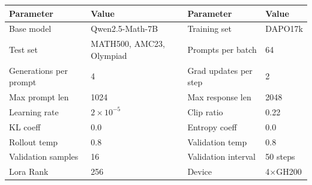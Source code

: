 \documentclass{article}
\theoremstyle{plain}
\theoremstyle{definition}
\theoremstyle{remark}
\begin{document}
\begin{table}[h]
  \centering
  \label{tab:config-7b}
  \begin{tcolorbox}[
    enhanced, hbox,
    title={Training setup of Qwen2.5-Math-7B},
    colback=teal!5, colframe=teal, coltext=black, coltitle=white,
    fonttitle=\bfseries, arc=1mm, boxrule=1pt, boxsep=1pt,
    left=2pt, right=2pt, top=0pt, bottom=2pt,
    toptitle=3pt, bottomtitle=3pt, center
  ]
    \small
    \renewcommand{\arraystretch}{1.2}
    \setlength{\tabcolsep}{8pt}
    \begin{tabular}{l|l|l|l}
      \textbf{Parameter} & \textbf{Value} & \textbf{Parameter} & \textbf{Value} \\
      \hline
      Base model & Qwen2.5-Math-7B & Training set & DAPO17k \\
      Test set & MATH500, AMC23, Olympiad & Prompts per batch & 64 \\
      Generations per prompt & 4 & Grad updates per step & 2 \\
      Max prompt len & 1024 & Max response len & 2048 \\
      Learning rate & $2 \times 10^{-5}$ & Clip ratio & 0.22 \\
      KL coeff & 0.0 & Entropy coeff & 0.0 \\
      Rollout temp & 0.8 & Validation temp & 0.8 \\
      Validation samples & 16 & Validation interval & 50 steps \\
      Lora Rank & 256 & Device & 4$\times$GH200 \\
    \end{tabular}
  \end{tcolorbox}
\end{table}
\end{document}
